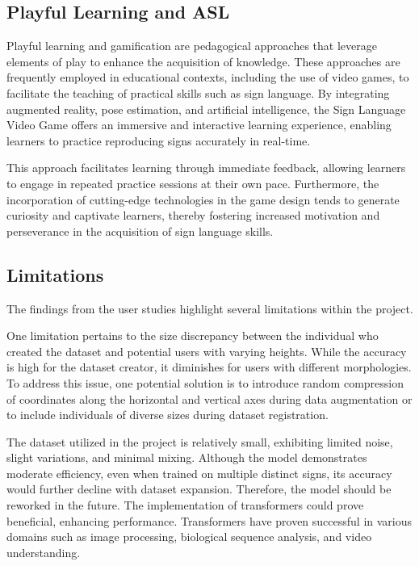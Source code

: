 \subsection{Playful Learning and ASL}


Playful learning and gamification are pedagogical approaches that leverage elements of play to enhance the acquisition of knowledge. These approaches are frequently employed in educational contexts, including the use of video games, to facilitate the teaching of practical skills such as sign language. By integrating augmented reality, pose estimation, and artificial intelligence, the Sign Language Video Game offers an immersive and interactive learning experience, enabling learners to practice reproducing signs accurately in real-time.

This approach facilitates learning through immediate feedback, allowing learners to engage in repeated practice sessions at their own pace. Furthermore, the incorporation of cutting-edge technologies in the game design tends to generate curiosity and captivate learners, thereby fostering increased motivation and perseverance in the acquisition of sign language skills.

\subsection{Limitations}

The findings from the user studies highlight several limitations within the project.

One limitation pertains to the size discrepancy between the individual who created the dataset and potential users with varying heights. While the accuracy is high for the dataset creator, it diminishes for users with different morphologies. To address this issue, one potential solution is to introduce random compression of coordinates along the horizontal and vertical axes during data augmentation or to include individuals of diverse sizes during dataset registration.

The dataset utilized in the project is relatively small, exhibiting limited noise, slight variations, and minimal mixing. Although the model demonstrates moderate efficiency, even when trained on multiple distinct signs, its accuracy would further decline with dataset expansion. Therefore, the model should be reworked in the future. The implementation of transformers could prove beneficial, enhancing performance. Transformers have proven successful in various domains such as image processing, biological sequence analysis, and video understanding.

